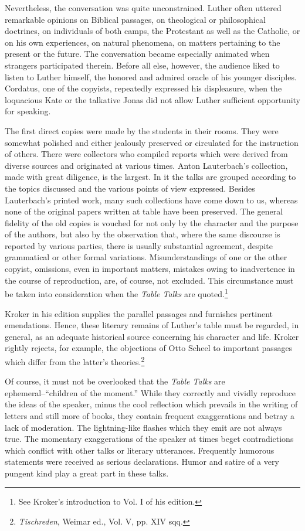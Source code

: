 Nevertheless, the conversation was quite unconstrained. Luther
often uttered remarkable opinions on Biblical passages, on theological
or philosophical doctrines, on individuals of both camps, the Protestant
as well as the Catholic, or on his own experiences, on natural
phenomena, on matters pertaining to the present or the future. The
conversation became especially animated when strangers participated
therein. Before all else, however, the audience liked to listen to Luther
himself, the honored and admired oracle of his younger disciples.
Cordatus, one of the copyists, repeatedly expressed his displeasure,
when the loquacious Kate or the talkative Jonas did not allow Luther
sufficient opportunity for speaking.

The first direct copies were made by the students in their rooms. They
were somewhat polished and either jealously preserved or circulated for the
instruction of others. There were collectors who compiled reports which
were derived from diverse sources and originated at various times. Anton
Lauterbach’s collection, made with great diligence, is the largest. In it the
talks are grouped according to the topics discussed and the various points of
view expressed. Besides Lauterbach’s printed work, many such collections
have come down to us, whereas none of the original papers written at table
have been preserved. The general fidelity of the old copies is vouched for not
only by the character and the purpose of the authors, but also by the observation
that, where the same discourse is reported by various parties, there is
usually substantial agreement, despite grammatical or other formal variations.
Misunderstandings of one or the other copyist, omissions, even in important
matters, mistakes owing to inadvertence in the course of reproduction, are, of
course, not excluded. This circumstance must be taken into consideration
when the \textit{Table Talks} are quoted.\footnote{See Kroker’s introduction to Vol. I of his edition.}

Kroker in his edition supplies the parallel passages and furnishes pertinent
emendations. Hence, these literary remains of Luther’s table must be regarded,
in general, as an adequate historical source concerning his character
and life. Kroker rightly rejects, for example, the objections of Otto
Scheel to important passages which differ from the latter’s theories.\footnote{\textit{Tischreden}, Weimar ed., Vol. V, pp. XIV sqq.}

Of course, it must not be overlooked that the \textit{Table Talks} are
ephemeral--“children of the moment.” While they correctly and
vividly reproduce the ideas of the speaker, minus the cool reflection
which prevails in the writing of letters and still more of books, they
contain frequent exaggerations and betray a lack of moderation. The
lightning-like flashes which they emit are not always true. The momentary
exaggerations of the speaker at times beget contradictions
which conflict with other talks or literary utterances. Frequently humorous
statements were received as serious declarations. Humor and
satire of a very pungent kind play a great part in these talks.

